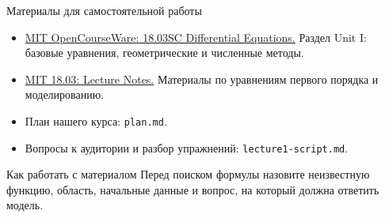 \documentclass[aspectratio=169,11pt]{beamer}
\begin{document}
\begin{frame}{Материалы для самостоятельной работы}
  \begin{itemize}
    \item \href{https://ocw.mit.edu/courses/18-03sc-differential-equations-fall-2011/}{MIT OpenCourseWare: 18.03SC Differential Equations.}
      Раздел Unit I: базовые уравнения, геометрические и численные методы.
    \item \href{https://ocw.mit.edu/courses/18-03-differential-equations-spring-2010/pages/lecture-notes/}{MIT 18.03: Lecture Notes.}
      Материалы по уравнениям первого порядка и моделированию.
    \item План нашего курса: \texttt{plan.md}.
    \item Вопросы к аудитории и разбор упражнений:
      \texttt{lecture1-script.md}.
  \end{itemize}
  \begin{block}{Как работать с материалом}
    Перед поиском формулы назовите неизвестную функцию, область,
    начальные данные и вопрос, на который должна ответить модель.
  \end{block}
\end{frame}
\end{document}
